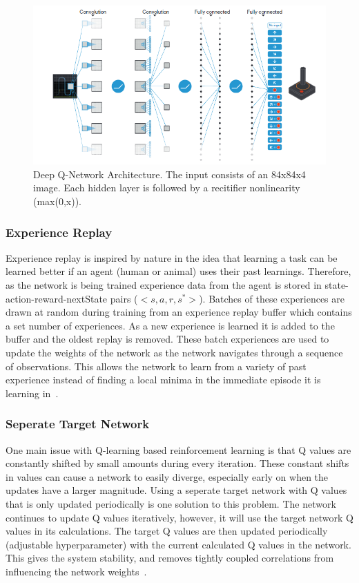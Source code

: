 \documentclass[12pt,american]{report}
\begin{document}
\begin{figure}
\centering
\includegraphics[scale=.85]{images/DQN-atari.png}
\caption{Deep Q-Network Architecture. The input consists of an 84x84x4 image. Each hidden layer is followed by a recitifier nonlinearity (max(0,x)).~\cite{atari}}
\label{fig:DQN-atari}
\end{figure}


\subsubsection{Experience Replay}

Experience replay is inspired by nature in the idea that learning a task can be learned better if an agent (human or animal) uses their past learnings.  Therefore, as the network is being trained experience data from the agent is stored in state-action-reward-nextState pairs ($<s,a,r,s^{*}>$). Batches of these experiences are drawn at random during training from an experience replay buffer which contains a set number of experiences.  As a new experience is learned it is added to the buffer and the oldest replay is removed. These batch experiences are used to update the weights of the network as the network navigates through a sequence of observations.  This allows the network to learn from a variety of past experience instead of finding a local minima in the immediate episode it is learning in~\cite{atari}.

\subsubsection{Seperate Target Network}

One main issue with Q-learning based reinforcement learning is that Q values are constantly shifted by small amounts during every iteration.  These constant shifts in values can cause a network to easily diverge, especially early on when the updates have a larger magnitude.  Using a seperate target network with Q values that is only updated periodically is one solution to this problem.  The network continues to update Q values iteratively, however, it will use the target network Q values in its calculations.  The target Q values are then updated periodically (adjustable hyperparameter) with the current calculated Q values in the network.  This gives the system stability, and removes tightly coupled correlations from influencing the network weights~\cite{atari}.
\end{document}

